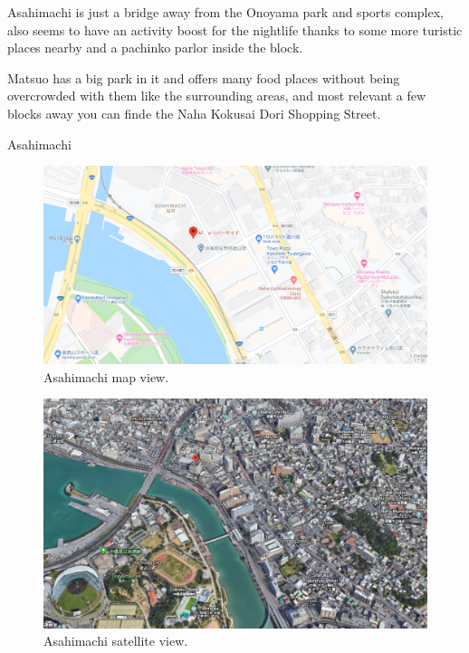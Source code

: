 \documentclass[11pt]{article}
\begin{document}
Asahimachi is just a bridge away from the Onoyama park and sports complex, also seems to have an activity boost for the nightlife thanks to some more turistic places nearby and a pachinko parlor inside the block.

Matsuo has a big park in it and offers many food places without being overcrowded with them like the surrounding areas, and most relevant a few blocks away you can finde the Naha Kokusai Dori Shopping Street.

Asahimachi

\begin{figure}[H]
    \centering
        \includegraphics[scale=.4]{figures/asahimachi2.png}
    \caption{Asahimachi map view.}
    \label{fig:1}
\end{figure}

\begin{figure}[H]
    \centering
        \includegraphics[scale=.4]{figures/asahimachi.png}
    \caption{Asahimachi satellite view.}
    \label{fig:1}
\end{figure}
\end{document}
